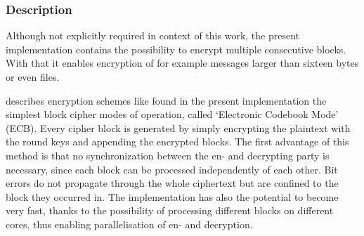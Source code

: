 \hypertarget{description-7}{%
\subsubsection{Description}\label{description-7}}

Although not explicitly required in context of this work, the present
implementation contains the possibility to encrypt multiple consecutive
blocks. With that it enables encryption of for example messages larger
than sixteen bytes or even files. 

\cite[ch. 5.1.1]{paar} describes
encryption schemes like found in the present implementation the simplest
block cipher modes of operation, called `Electronic Codebook Mode' (ECB).
Every cipher block is generated by simply encrypting the plaintext with
the round keys and appending the encrypted blocks. The first advantage
of this method is that no synchronization between the en- and decrypting
party is necessary, since each block can be processed independently of
each other. Bit errors do not propagate through the whole ciphertext but
are confined to the block they occurred in. The implementation has also
the potential to become very fast, thanks to the possibility of
processing different blocks on different cores, thus enabling
parallelisation of en- and decryption. 

